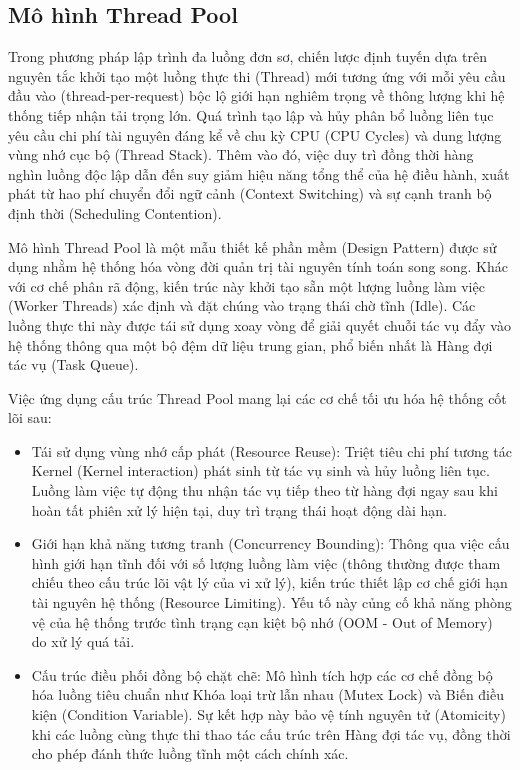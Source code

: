 \subsection{Mô hình Thread Pool}

Trong phương pháp lập trình đa luồng đơn sơ, chiến lược định tuyến dựa trên nguyên tắc khởi tạo một luồng thực thi (Thread) mới tương ứng với mỗi yêu cầu đầu vào (thread-per-request) bộc lộ giới hạn nghiêm trọng về thông lượng khi hệ thống tiếp nhận tải trọng lớn. Quá trình tạo lập và hủy phân bổ luồng liên tục yêu cầu chi phí tài nguyên đáng kể về chu kỳ CPU (CPU Cycles) và dung lượng vùng nhớ cục bộ (Thread Stack). Thêm vào đó, việc duy trì đồng thời hàng nghìn luồng độc lập dẫn đến suy giảm hiệu năng tổng thể của hệ điều hành, xuất phát từ hao phí chuyển đổi ngữ cảnh (Context Switching) và sự cạnh tranh bộ định thời (Scheduling Contention).

Mô hình Thread Pool là một mẫu thiết kế phần mềm (Design Pattern) được sử dụng nhằm hệ thống hóa vòng đời quản trị tài nguyên tính toán song song. Khác với cơ chế phân rã động, kiến trúc này khởi tạo sẵn một lượng luồng làm việc (Worker Threads) xác định và đặt chúng vào trạng thái chờ tĩnh (Idle). Các luồng thực thi này được tái sử dụng xoay vòng để giải quyết chuỗi tác vụ đẩy vào hệ thống thông qua một bộ đệm dữ liệu trung gian, phổ biến nhất là Hàng đợi tác vụ (Task Queue).

Việc ứng dụng cấu trúc Thread Pool mang lại các cơ chế tối ưu hóa hệ thống cốt lõi sau:
\begin{itemize}[label={-}]
    \item Tái sử dụng vùng nhớ cấp phát (Resource Reuse): Triệt tiêu chi phí tương tác Kernel (Kernel interaction) phát sinh từ tác vụ sinh và hủy luồng liên tục. Luồng làm việc tự động thu nhận tác vụ tiếp theo từ hàng đợi ngay sau khi hoàn tất phiên xử lý hiện tại, duy trì trạng thái hoạt động dài hạn.
    \item Giới hạn khả năng tương tranh (Concurrency Bounding): Thông qua việc cấu hình giới hạn tĩnh đối với số lượng luồng làm việc (thông thường được tham chiếu theo cấu trúc lõi vật lý của vi xử lý), kiến trúc thiết lập cơ chế giới hạn tài nguyên hệ thống (Resource Limiting). Yếu tố này củng cố khả năng phòng vệ của hệ thống trước tình trạng cạn kiệt bộ nhớ (OOM - Out of Memory) do xử lý quá tải.
    \item Cấu trúc điều phối đồng bộ chặt chẽ: Mô hình tích hợp các cơ chế đồng bộ hóa luồng tiêu chuẩn như Khóa loại trừ lẫn nhau (Mutex Lock) và Biến điều kiện (Condition Variable). Sự kết hợp này bảo vệ tính nguyên tử (Atomicity) khi các luồng cùng thực thi thao tác cấu trúc trên Hàng đợi tác vụ, đồng thời cho phép đánh thức luồng tĩnh một cách chính xác.
\end{itemize}

